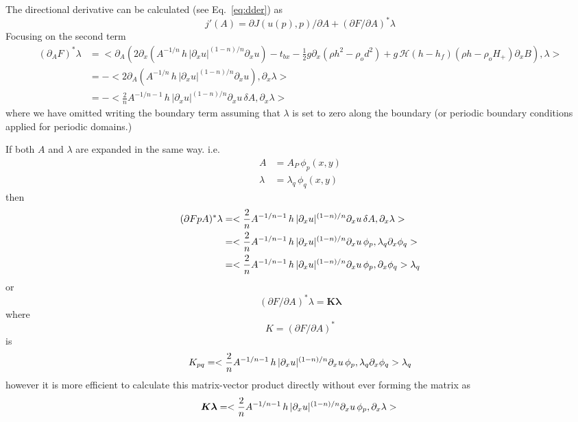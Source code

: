 \documentclass[10pt,a4paper]{book}
\newcommand{\He}{\mathcal{H}}
\newcommand{\p}{\partial}
\newcommand{\tbx}{t_{bx}}
\begin{document}
The directional derivative can be calculated (see Eq.~\ref{eq:dder}) as
\begin{equation}
j'(A)= \p J(u(p),p)/ \p A + (\p F / \p A)^\ast  \lambda
\label{eq:dder2}
\end{equation}
Focusing on the second term
\begin{align*}
  (\p_A F )^\ast  \lambda & = <\p_A  \left ( 2 \p_x ( A^{-1/n} \, h \, | \p_x u|^{(1-n)/n}   \p_x u ) - \tbx - \frac{1}{2} g \p_x (\rho h^2 - \rho_o d^2)+ g\,\He(h-h_f) (\rho h -\rho_o H_{+}) \p_x B \right ) , \lambda>\\
                             & = - <  2 \p_A \left ( A^{-1/n} \, h \, | \p_x u|^{(1-n)/n}   \p_x u \right ) , \p_x \lambda>\\
                             & = - <  \frac{2}{n}  A^{-1/n-1} \, h \, | \p_x u|^{(1-n)/n}   \p_x u \, \delta A, \p_x \lambda>
\end{align*}
where we have omitted writing the boundary term assuming that
$\lambda$ is set to zero along the boundary (or periodic boundary
conditions applied for periodic domains.)

If both $A$ and $\lambda$ are expanded in the same way. i.e.
\begin{align*} 
        A & = A_P \, \phi_p(x,y) \\ 
 \lambda & =\lambda_q \, \phi_q(x,y)
\end{align*}
then
\begin{align*}
  (\p F \/p A)^{\ast} \lambda &= <  \frac{2}{n}  A^{-1/n-1} \, h \, | \p_x u|^{(1-n)/n}   \p_x u \, \delta A, \p_x \lambda> \\
            &=    <  \frac{2}{n}  A^{-1/n-1} \, h \, | \p_x u|^{(1-n)/n}   \p_x u \, \phi_p, \lambda_q \p_x \phi_q> \\
            &=    <  \frac{2}{n}  A^{-1/n-1} \, h \, | \p_x u|^{(1-n)/n}   \p_x u \, \phi_p, \p_x \phi_q>  \lambda_q \\
\end{align*}
or
 \[
 (\p F /\p A)^{\ast} \lambda = \bm{K} \bm{\lambda}
\]
where
\[
K= (\p F /\p A)^{\ast} 
\]
is
\[
K_{pq}=<  \frac{2}{n}  A^{-1/n-1} \, h \, | \p_x u|^{(1-n)/n}   \p_x u \, \phi_p, \lambda_q \p_x \phi_q>  \lambda_q \\
\]
however it is more efficient to calculate this matrix-vector product
directly without ever forming the matrix as
\[
  \bm{K} \bm{\lambda}= <  \frac{2}{n}  A^{-1/n-1} \, h \, | \p_x u|^{(1-n)/n}   \p_x u \, \phi_p, \p_x \lambda> \\
\]
\end{document}
